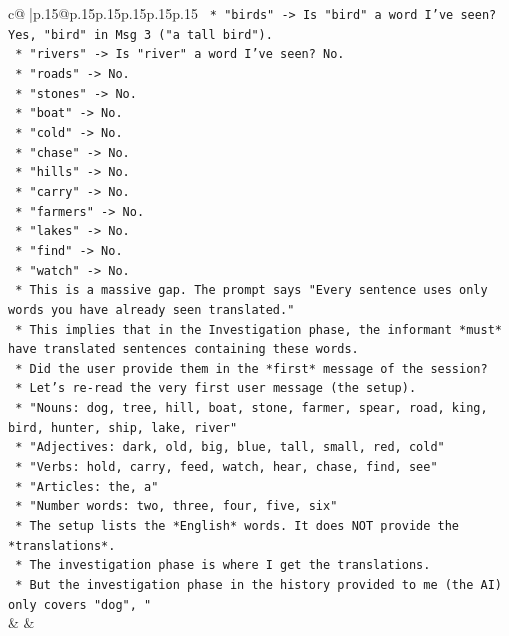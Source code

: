 \documentclass{article}
\begin{document}
{\begin{supertabular}{c@{$\;$}|p{.15\linewidth}@{}p{.15\linewidth}p{.15\linewidth}p{.15\linewidth}p{.15\linewidth}p{.15\linewidth}}
{{{\texttt{            *   "birds" {-}> Is "bird" a word I've seen? Yes, "bird" in Msg 3 ("a tall bird").} \\
\texttt{            *   "rivers" {-}> Is "river" a word I've seen? No.} \\
\texttt{            *   "roads" {-}> No.} \\
\texttt{            *   "stones" {-}> No.} \\
\texttt{            *   "boat" {-}> No.} \\
\texttt{            *   "cold" {-}> No.} \\
\texttt{            *   "chase" {-}> No.} \\
\texttt{            *   "hills" {-}> No.} \\
\texttt{            *   "carry" {-}> No.} \\
\texttt{            *   "farmers" {-}> No.} \\
\texttt{            *   "lakes" {-}> No.} \\
\texttt{            *   "find" {-}> No.} \\
\texttt{            *   "watch" {-}> No.} \\
\texttt{        *   This is a massive gap. The prompt says "Every sentence uses only words you have already seen translated."} \\
\texttt{        *   This implies that in the Investigation phase, the informant *must* have translated sentences containing these words.} \\
\texttt{        *   Did the user provide them in the *first* message of the session?} \\
\texttt{        *   Let's re{-}read the very first user message (the setup).} \\
\texttt{            *   "Nouns: dog, tree, hill, boat, stone, farmer, spear, road, king, bird, hunter, ship, lake, river"} \\
\texttt{            *   "Adjectives: dark, old, big, blue, tall, small, red, cold"} \\
\texttt{            *   "Verbs: hold, carry, feed, watch, hear, chase, find, see"} \\
\texttt{            *   "Articles: the, a"} \\
\texttt{            *   "Number words: two, three, four, five, six"} \\
\texttt{        *   The setup lists the *English* words. It does NOT provide the *translations*.} \\
\texttt{        *   The investigation phase is where I get the translations.} \\
\texttt{        *   But the investigation phase in the history provided to me (the AI) only covers "dog", "} \\
            }
        }
    }
    & & \\ \\


\end{supertabular}}
\end{document}
